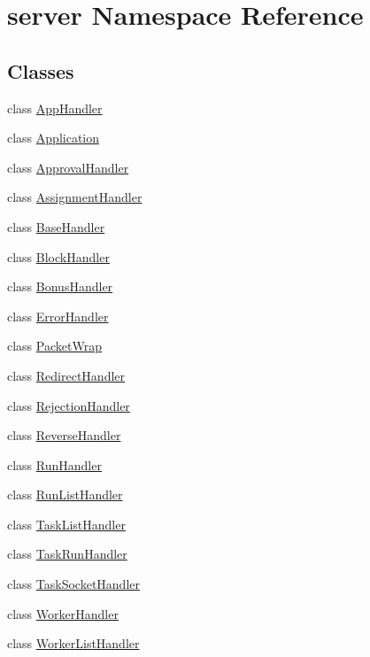 \hypertarget{namespaceserver}{}\section{server Namespace Reference}
\label{namespaceserver}
\subsection*{Classes}
\begin{DoxyCompactItemize}
\item 
class \hyperlink{classserver_1_1AppHandler}{App\+Handler}
\item 
class \hyperlink{classserver_1_1Application}{Application}
\item 
class \hyperlink{classserver_1_1ApprovalHandler}{Approval\+Handler}
\item 
class \hyperlink{classserver_1_1AssignmentHandler}{Assignment\+Handler}
\item 
class \hyperlink{classserver_1_1BaseHandler}{Base\+Handler}
\item 
class \hyperlink{classserver_1_1BlockHandler}{Block\+Handler}
\item 
class \hyperlink{classserver_1_1BonusHandler}{Bonus\+Handler}
\item 
class \hyperlink{classserver_1_1ErrorHandler}{Error\+Handler}
\item 
class \hyperlink{classserver_1_1PacketWrap}{Packet\+Wrap}
\item 
class \hyperlink{classserver_1_1RedirectHandler}{Redirect\+Handler}
\item 
class \hyperlink{classserver_1_1RejectionHandler}{Rejection\+Handler}
\item 
class \hyperlink{classserver_1_1ReverseHandler}{Reverse\+Handler}
\item 
class \hyperlink{classserver_1_1RunHandler}{Run\+Handler}
\item 
class \hyperlink{classserver_1_1RunListHandler}{Run\+List\+Handler}
\item 
class \hyperlink{classserver_1_1TaskListHandler}{Task\+List\+Handler}
\item 
class \hyperlink{classserver_1_1TaskRunHandler}{Task\+Run\+Handler}
\item 
class \hyperlink{classserver_1_1TaskSocketHandler}{Task\+Socket\+Handler}
\item 
class \hyperlink{classserver_1_1WorkerHandler}{Worker\+Handler}
\item 
class \hyperlink{classserver_1_1WorkerListHandler}{Worker\+List\+Handler}
\end{DoxyCompactItemize}

